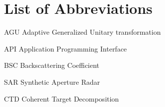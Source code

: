 \chapter*{List of Abbreviations}
\label{ch:ListOfAbr}

\makeatletter
\newcommand{\tocfill}{\cleaders\hbox{}\hfill}
\makeatother
\newcommand{\abbrlabel}[1]{\makebox[3cm][l]{\textbf{#1}\ \tocfill}}
\newenvironment{abbreviations}{\begin{list}{}{\renewcommand{\makelabel}{\abbrlabel}
                                              \setlength{\itemsep}{0pt}}}{\end{list}}
\begin{abbreviations}
\item[AGU] 	Adaptive Generalized Unitary transformation
\item[API] Application Programming Interface
\item[BSC]	Backscattering Coefficient
\item[SAR]  Synthetic Aperture Radar  
\item[CTD]	Coherent Target Decomposition
\end{abbreviations}
